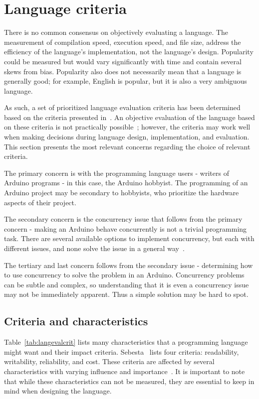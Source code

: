 \section{Language criteria}\label{sec:languageeval}
There is no common consensus on objectively evaluating a language. The measurement of compilation speed, execution speed, and file size, address the efficiency of the language's implementation, not the language's design. Popularity could be measured but would vary significantly with time and contain several skews from bias. Popularity also does not necessarily mean that a language is generally good; for example, English is popular, but it is also a very ambiguous language.

As such, a set of prioritized language evaluation criteria has been determined based on the criteria presented in~\cite{Sebesta2016}. An objective evaluation of the language based on these criteria is not practically possible~\cite{Sebesta2016}; however, the criteria may work well when making decisions during language design, implementation, and evaluation. This section presents the most relevant concerns regarding the choice of relevant criteria.

The primary concern is with the programming language users - writers of Arduino programs - in this case, the Arduino hobbyist. The programming of an Arduino project may be secondary to hobbyists, who prioritize the hardware aspects of their project.

The secondary concern is the concurrency issue that follows from the primary concern - making an Arduino behave concurrently is not a trivial programming task. There are several available options to implement concurrency, but each with different issues, and none solve the issue in a general way~\cite{Restucia2022}.

The tertiary and last concern follows from the secondary issue - determining how to use concurrency to solve the problem in an Arduino. Concurrency problems can be subtle and complex, so understanding that it is even a  concurrency issue may not be immediately apparent. Thus a simple solution may be hard to spot.


\subsection{Criteria and characteristics}\label{subsec:priorityofcriteria}
Table~\ref{tab:langevalcrit} lists many characteristics that a programming language might want and their impact criteria. Sebesta~\cite{Sebesta2016} lists four criteria: readability, writability, reliability, and cost. These criteria are affected by several characteristics with varying influence and importance~\cite{Sebesta2016}. It is important to note that while these characteristics can not be measured, they are essential to keep in mind when designing the language.


